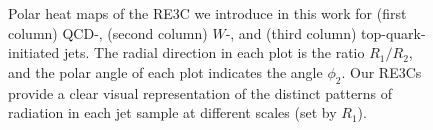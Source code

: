 \begin{figure}
{    }
    \caption[Polar heat maps of the resolved three-point energy corrleator on QCD, \(W\), and top jets.]{
        Polar heat maps of the RE3C we introduce in this work for (first column) QCD-, (second column) \(W\)-, and (third column) top-quark-initiated jets.
        The radial direction in each plot is the ratio \(R_1/R_2\), and the polar angle of each plot indicates the angle \(\phi_2\).
        Our RE3Cs provide a clear visual representation of the distinct patterns of radiation in each jet sample at different scales (set by \(R_1\)).
    }
	\label{fig:pythia_re3cs}%
\end{figure}

